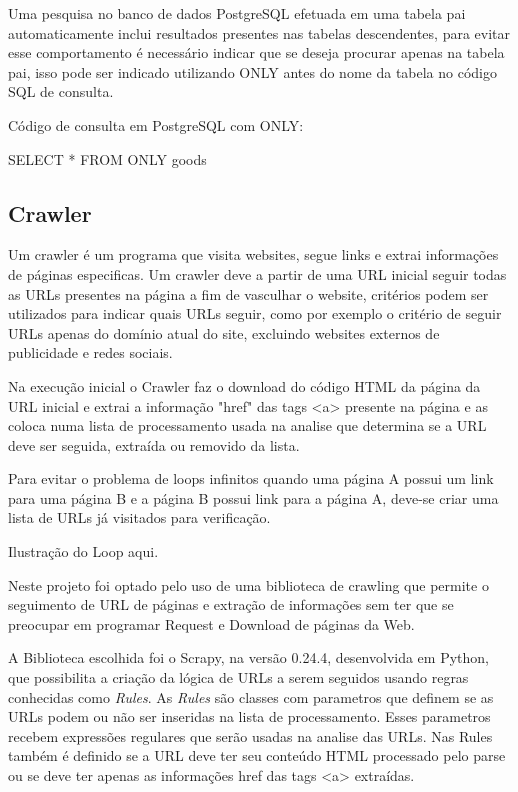 \documentclass[12pt]{article}
\begin{document}
Uma pesquisa no banco de dados PostgreSQL efetuada em uma tabela pai automaticamente inclui resultados presentes nas tabelas descendentes, para evitar esse comportamento é necessário indicar que se deseja procurar apenas na tabela pai, isso pode ser indicado utilizando ONLY antes do nome da tabela no código SQL de consulta.

Código de consulta em PostgreSQL com ONLY:

SELECT * FROM ONLY goods 


\subsection{Crawler}

Um crawler é um programa que visita websites, segue links e extrai informações de páginas especificas. Um crawler deve a partir de uma URL inicial seguir todas as URLs presentes na página a fim de vasculhar o website, critérios podem ser utilizados para indicar quais URLs seguir, como por exemplo o critério de seguir URLs apenas do domínio atual do site, excluindo websites externos de publicidade e redes sociais.

Na execução inicial o Crawler faz o download do código HTML da página da URL inicial e extrai a informação "href" das tags <a> presente na página e as coloca numa lista de processamento usada na analise que determina se a URL deve ser seguida, extraída ou removido da lista. 

Para evitar o problema de loops infinitos quando uma página A possui um link para uma página B e a página B possui link para a página A, deve-se criar uma lista de URLs já visitados para verificação.  
 
Ilustração do Loop aqui. 

Neste projeto foi optado pelo uso de uma biblioteca de crawling que permite o seguimento de URL de páginas e extração de informações sem ter que se preocupar em programar Request e Download de páginas da Web.

A Biblioteca escolhida foi o Scrapy, na versão 0.24.4, desenvolvida em Python, que possibilita a criação da lógica de URLs a serem seguidos usando regras conhecidas como \textit{Rules}. As \textit{Rules} são classes com parametros que definem se as URLs podem ou não ser inseridas na lista de processamento. Esses parametros recebem expressões regulares que serão usadas na analise das URLs. Nas Rules também é definido se a URL deve ter seu conteúdo HTML processado pelo parse ou se deve ter apenas as informações href das tags <a> extraídas.
\end{document}
